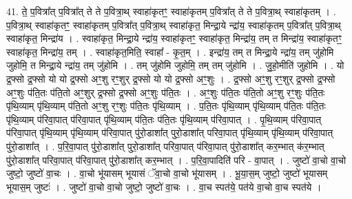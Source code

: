 \documentclass[17pt]{extarticle}
\begin{document}
41. ते॒ प॒वित्रा᳚त् प॒वित्रा᳚त् ते ते प॒वित्रा॒थ् स्वाहा॑कृतꣳ॒॒ स्वाहा॑कृतम् प॒वित्रा᳚त् ते ते प॒वित्रा॒थ् स्वाहा॑कृतम् । . प॒वित्रा॒थ् स्वाहा॑कृतꣳ॒॒ स्वाहा॑कृतम् प॒वित्रा᳚त् प॒वित्रा॒थ् स्वाहा॑कृत॒ मिन्द्रा॒ये न्द्रा॑य॒ स्वाहा॑कृतम् प॒वित्रा᳚त् प॒वित्रा॒थ् स्वाहा॑कृत॒ मिन्द्रा॑य । . स्वाहा॑कृत॒ मिन्द्रा॒ये न्द्रा॑य॒ स्वाहा॑कृतꣳ॒॒ स्वाहा॑कृत॒ मिन्द्रा॑य॒ तम् त मिन्द्रा॑य॒ स्वाहा॑कृतꣳ॒॒ स्वाहा॑कृत॒ मिन्द्रा॑य॒ तम् । . स्वाहा॑कृत॒मिति॒ स्वाहा᳚ - कृ॒त॒म् । . इन्द्रा॑य॒ तम् त मिन्द्रा॒ये न्द्रा॑य॒ तम् जु॑होमि जुहोमि॒ त मिन्द्रा॒ये न्द्रा॑य॒ तम् जु॑होमि । . तम् जु॑होमि जुहोमि॒ तम् तम् जु॑होमि । . जु॒हो॒मीति॑ जुहोमि । . यो द्र॒फ्सो द्र॒फ्सो यो यो द्र॒फ्सो अꣳ॒॒शु रꣳ॒॒शुर् द्र॒फ्सो यो यो द्र॒फ्सो अꣳ॒॒शुः । . द्र॒फ्सो अꣳ॒॒शु रꣳ॒॒शुर् द्र॒फ्सो द्र॒फ्सो अꣳ॒॒शुः प॑ति॒तः प॑ति॒तो अꣳ॒॒शुर् द्र॒फ्सो द्र॒फ्सो अꣳ॒॒शुः प॑ति॒तः । . अꣳ॒॒शुः प॑ति॒तः प॑ति॒तो अꣳ॒॒शु रꣳ॒॒शुः प॑ति॒तः पृ॑थि॒व्याम् पृ॑थि॒व्याम् प॑ति॒तो अꣳ॒॒शु रꣳ॒॒शुः प॑ति॒तः पृ॑थि॒व्याम् । . प॒ति॒तः पृ॑थि॒व्याम् पृ॑थि॒व्याम् प॑ति॒तः प॑ति॒तः पृ॑थि॒व्याम् प॑रिवा॒पात् प॑रिवा॒पात् पृ॑थि॒व्याम् प॑ति॒तः प॑ति॒तः पृ॑थि॒व्याम् प॑रिवा॒पात् । . पृ॒थि॒व्याम् प॑रिवा॒पात् प॑रिवा॒पात् पृ॑थि॒व्याम् पृ॑थि॒व्याम् प॑रिवा॒पात् पु॑रो॒डाशा᳚त् पुरो॒डाशा᳚त् परिवा॒पात् पृ॑थि॒व्याम् पृ॑थि॒व्याम् प॑रिवा॒पात् पु॑रो॒डाशा᳚त् । . प॒रि॒वा॒पात् पु॑रो॒डाशा᳚त् पुरो॒डाशा᳚त् परिवा॒पात् प॑रिवा॒पात् पु॑रो॒डाशा᳚त् कर॒म्भात् क॑र॒म्भात् पु॑रो॒डाशा᳚त् परिवा॒पात् प॑रिवा॒पात् पु॑रो॒डाशा᳚त् कर॒म्भात् । . प॒रि॒वा॒पादिति॑ परि - वा॒पात् । . जुष्टो॑ वा॒चो वा॒चो जुष्टो॒ जुष्टो॑ वा॒चः । . वा॒चो भू॑यासम् भूयासं ॅवा॒चो वा॒चो भू॑यासम् । . भू॒या॒स॒म् जुष्टो॒ जुष्टो॑ भूयासम् भूयास॒म् जुष्टः॑ । . जुष्टो॑ वा॒चो वा॒चो जुष्टो॒ जुष्टो॑ वा॒चः । . वा॒च स्पत॑ये॒ पत॑ये वा॒चो वा॒च स्पत॑ये । \newline
\end{document}
